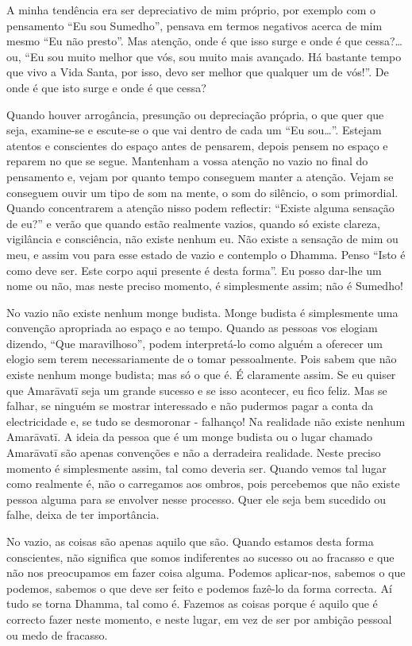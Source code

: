 A minha tendência era ser depreciativo de mim próprio, por exemplo com o
pensamento “Eu sou Sumedho”, pensava em termos negativos acerca de mim mesmo “Eu
não presto”. Mas atenção, onde é que isso surge e onde é que cessa?\ldots{} ou,
“Eu sou muito melhor que vós, sou muito mais avançado. Há bastante tempo que
vivo a Vida Santa, por isso, devo ser melhor que qualquer um de vós!”. De onde é
que isto surge e onde é que cessa?

Quando houver arrogância, presunção ou depreciação própria, o que quer que seja,
examine-se e escute-se o que vai dentro de cada um “Eu sou\ldots{}”. Estejam
atentos e conscientes do espaço antes de pensarem, depois pensem no espaço e
reparem no que se segue. Mantenham a vossa atenção no vazio no final do
pensamento e, vejam por quanto tempo conseguem manter a atenção. Vejam se
conseguem ouvir um tipo de som na mente, o som do silêncio, o som primordial.
Quando concentrarem a atenção nisso podem reflectir: “Existe alguma sensação de
eu?” e verão que quando estão realmente vazios, quando só existe clareza,
vigilância e consciência, não existe nenhum eu. Não existe a sensação de mim ou meu, e assim vou para esse estado de vazio e contemplo o Dhamma. Penso “Isto é como
deve ser. Este corpo aqui presente é desta forma”. Eu posso dar-lhe um
nome ou não, mas neste preciso momento, é simplesmente assim; não é Sumedho!

No vazio não existe nenhum monge budista. Monge budista é simplesmente uma
convenção apropriada ao espaço e ao tempo. Quando as pessoas vos elogiam
dizendo, “Que maravilhoso”, podem interpretá-lo como alguém a oferecer um elogio
sem terem necessariamente de o tomar pessoalmente. Pois sabem que não existe
nenhum monge budista; mas só o que é. É claramente assim. Se eu quiser que
Amarāvatī seja um grande sucesso e se isso acontecer, eu fico feliz. Mas se
falhar, se ninguém se mostrar interessado e não pudermos pagar a conta da
electricidade e, se tudo se desmoronar - falhanço! Na realidade não existe
nenhum Amarāvatī. A ideia da pessoa que é um monge budista ou o lugar chamado
Amarāvatī são apenas convenções e não a derradeira realidade. Neste preciso
momento é simplesmente assim, tal como deveria ser. Quando vemos tal lugar como
realmente é, não o carregamos aos ombros, pois percebemos que não existe pessoa
alguma para se envolver nesse processo. Quer ele seja bem sucedido ou falhe, deixa de ter importância.

No vazio, as coisas são apenas aquilo que são. Quando estamos desta forma conscientes, não significa que somos indiferentes ao sucesso ou ao fracasso e que
não nos preocupamos em fazer coisa alguma. Podemos aplicar-nos, sabemos o
que podemos, sabemos o que deve ser feito e podemos fazê-lo da forma correcta.
Aí tudo se torna Dhamma, tal como é. Fazemos as coisas porque é aquilo que é
correcto fazer neste momento, e neste lugar, em vez de ser por ambição pessoal
ou medo de fracasso.

